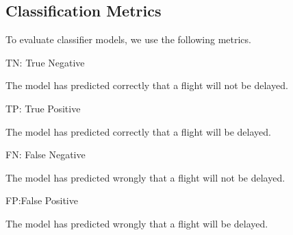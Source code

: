 \documentclass[12pt,letter-paper]{article}
\begin{document}
     \subsection{Classification Metrics}
            \begin{flushleft}
                To evaluate classifier models, we use the following metrics.
                \linebreak
                
                TN: True Negative
                
                The model has predicted correctly that a flight will not be delayed.
                \linebreak
                
                TP: True Positive
                
                The model has predicted correctly that a flight will be delayed.
                \linebreak
                
                FN: False Negative
                
                The model has predicted wrongly that a flight will not be delayed.
                \linebreak
                
                FP:False Positive
                
                The model has predicted wrongly that a flight will be delayed.
                \linebreak
            \end{flushleft}
\end{document}

